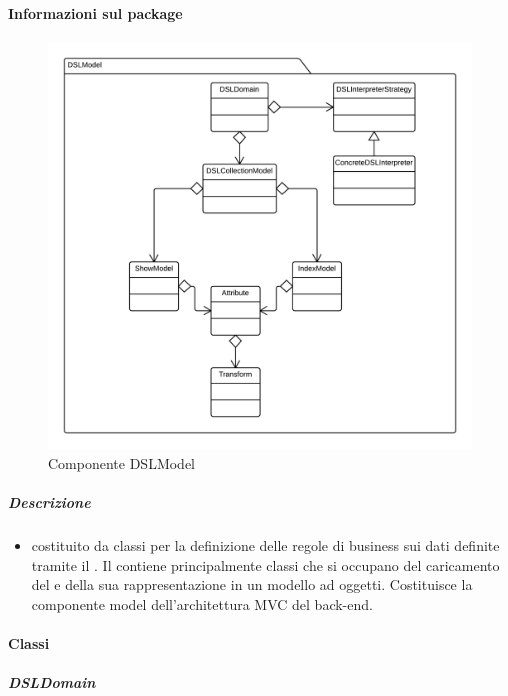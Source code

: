 	\paragraph{Informazioni sul package} 
		\begin{figure}[H] 
			\begin{center} 
				\includegraphics[scale=0.17]{uml/package/Back-end::Lib::Model::DSLModel.png}  
				\caption{Componente DSLModel}
			\end{center}  
		\end{figure} 
	\subparagraph{Descrizione} 
		\begin{itemize}
		\item[]  costituito da classi per la definizione delle regole di business sui dati definite tramite il  . Il  contiene principalmente classi che si occupano del caricamento del  e della sua rappresentazione in un modello ad oggetti. Costituisce la componente model dell’architettura MVC del back-end.

		\end{itemize} 
		\paragraph{Classi}
			\subparagraph{DSLDomain}
				
